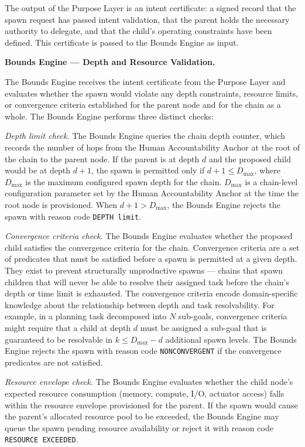 The output of the Purpose Layer is an intent certificate: a signed record that the spawn request has passed intent validation, that the parent holds the necessary authority to delegate, and that the child's operating constraints have been defined. This certificate is passed to the Bounds Engine as input.

\bigskip

\noindent\textbf{Bounds Engine — Depth and Resource Validation.}

The Bounds Engine receives the intent certificate from the Purpose Layer and evaluates whether the spawn would violate any depth constraints, resource limits, or convergence criteria established for the parent node and for the chain as a whole. The Bounds Engine performs three distinct checks:

\bigskip
\noindent\textit{Depth limit check.} The Bounds Engine queries the chain depth counter, which records the number of hops from the Human Accountability Anchor at the root of the chain to the parent node. If the parent is at depth $d$ and the proposed child would be at depth $d+1$, the spawn is permitted only if $d+1 \leq D_{\max}$, where $D_{\max}$ is the maximum configured spawn depth for the chain. $D_{\max}$ is a chain-level configuration parameter set by the Human Accountability Anchor at the time the root node is provisioned. When $d+1 > D_{\max}$, the Bounds Engine rejects the spawn with reason code \texttt{DEPTH\ limit}.

\bigskip
\noindent\textit{Convergence criteria check.} The Bounds Engine evaluates whether the proposed child satisfies the convergence criteria for the chain. Convergence criteria are a set of predicates that must be satisfied before a spawn is permitted at a given depth. They exist to prevent structurally unproductive spawns — chains that spawn children that will never be able to resolve their assigned task before the chain's depth or time limit is exhausted. The convergence criteria encode domain-specific knowledge about the relationship between depth and task resolvability. For example, in a planning task decomposed into $N$ sub-goals, convergence criteria might require that a child at depth $d$ must be assigned a sub-goal that is guaranteed to be resolvable in $k \leq D_{\max} - d$ additional spawn levels. The Bounds Engine rejects the spawn with reason code \texttt{NONCONVERGENT} if the convergence predicates are not satisfied.

\bigskip
\noindent\textit{Resource envelope check.} The Bounds Engine evaluates whether the child node's expected resource consumption (memory, compute, I/O, actuator access) falls within the resource envelope provisioned for the parent. If the spawn would cause the parent's allocated resource pool to be exceeded, the Bounds Engine may queue the spawn pending resource availability or reject it with reason code \texttt{RESOURCE\ EXCEEDED}.

